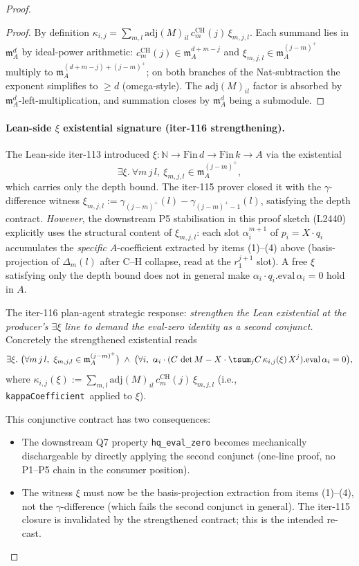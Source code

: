 \begin{proof}
\begin{proof}
By definition $\kappa_{i,j} = \sum_{m, l} \mathrm{adj}(M)_{il}
\,c^{\mathrm{CH}}_m(j)\,\xi_{m,j,l}$. Each summand lies in
$\mathfrak m_A^{d}$ by ideal-power arithmetic:
$c^{\mathrm{CH}}_m(j) \in \mathfrak m_A^{d + m - j}$ and
$\xi_{m,j,l} \in \mathfrak m_A^{(j - m)^{+}}$ multiply to
$\mathfrak m_A^{(d + m - j) + (j - m)^{+}}$; on both branches of
the Nat-subtraction the exponent simplifies to $\ge d$
(omega-style). The $\mathrm{adj}(M)_{il}$ factor is absorbed by
$\mathfrak m_A^{d}$-left-multiplication, and summation closes by
$\mathfrak m_A^{d}$ being a submodule.
\end{proof}

\paragraph{Lean-side $\xi$ existential signature (iter-116
strengthening).} The Lean-side iter-113 introduced
$\xi : \mathbb N \to \mathrm{Fin}\,d \to \mathrm{Fin}\,k \to A$
via the existential
\[
\exists \xi.\ \forall m\,j\,l,\ \xi_{m,j,l}
\in \mathfrak m_A^{(j - m)^{+}},
\]
which carries only the depth bound. The iter-115 prover closed
it with the $\gamma$-difference witness
$\xi_{m,j,l} := \gamma_{(j - m)^{+}}(l) - \gamma_{(j - m)^{+} - 1}(l)$,
satisfying the depth contract. \emph{However}, the downstream
P5 stabilisation in this proof sketch (L2440) explicitly uses
the structural content of $\xi_{m,j,l}$: each slot
$\alpha_i^{m+1}$ of $p_i = X \cdot q_i$ accumulates the
\emph{specific} $A$-coefficient extracted by items (1)--(4) above
(basis-projection of $\Delta_m(l)$ after C--H collapse, read at
the $r_1^{j+1}$ slot). A free $\xi$ satisfying only the depth
bound does not in general make $\alpha_i \cdot
q_i.\mathrm{eval}\,\alpha_i = 0$ hold in $A$.

The iter-116 plan-agent strategic response: \emph{strengthen the
Lean existential at the producer's $\exists \xi$ line to demand
the eval-zero identity as a second conjunct.}
Concretely the strengthened existential reads
\[
\exists \xi.\ \bigl(\forall m\,j\,l,\
\xi_{m,j,l} \in \mathfrak m_A^{(j - m)^{+}}\bigr) \;\land\;
\bigl(\forall i,\ \alpha_i \cdot
(C\,\det M - X \cdot \tsum_j C\,\kappa_{i,j}(\xi)\,X^j)
.\mathrm{eval}\,\alpha_i = 0\bigr),
\]
where $\kappa_{i,j}(\xi) := \sum_{m,l}
\mathrm{adj}(M)_{il}\,c^{\mathrm{CH}}_m(j)\,\xi_{m,j,l}$
(i.e., \texttt{kappaCoefficient}\ applied to $\xi$).

This conjunctive contract has two consequences:
\begin{itemize}
\item The downstream Q7 property \texttt{hq\_eval\_zero}
becomes mechanically dischargeable by directly applying the
second conjunct (one-line proof, no P1--P5 chain in the consumer
position).
\item The witness $\xi$ must now be the basis-projection
extraction from items (1)--(4), not the $\gamma$-difference (which
fails the second conjunct in general). The iter-115 closure is
invalidated by the strengthened contract; this is the intended
re-cast.
\end{itemize}


\end{proof}
